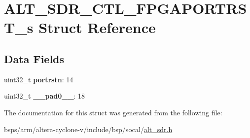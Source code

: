 \hypertarget{structALT__SDR__CTL__FPGAPORTRST__s}{}\section{A\+L\+T\+\_\+\+S\+D\+R\+\_\+\+C\+T\+L\+\_\+\+F\+P\+G\+A\+P\+O\+R\+T\+R\+S\+T\+\_\+s Struct Reference}
\label{structALT__SDR__CTL__FPGAPORTRST__s}
\subsection*{Data Fields}
\begin{DoxyCompactItemize}
\item 
\mbox{\label{structALT__SDR__CTL__FPGAPORTRST__s_a428fa83e9968e26a174623fa0604945a}} 
uint32\+\_\+t {\bfseries portrstn}\+: 14
\item 
\mbox{\label{structALT__SDR__CTL__FPGAPORTRST__s_aabfad6e86a2fce17f832e8bd0955012e}} 
uint32\+\_\+t {\bfseries \+\_\+\+\_\+pad0\+\_\+\+\_\+}\+: 18
\end{DoxyCompactItemize}


The documentation for this struct was generated from the following file\+:\begin{DoxyCompactItemize}
\item 
bsps/arm/altera-\/cyclone-\/v/include/bsp/socal/\mbox{\hyperlink{alt__sdr_8h}{alt\+\_\+sdr.\+h}}\end{DoxyCompactItemize}
